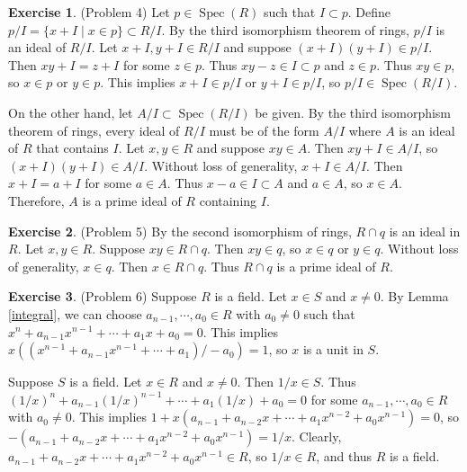 \documentclass[12pt, psamsfonts]{amsart}
\theoremstyle{definition}
\newtheorem*{exer}{Exercise}
\theoremstyle{remark}
\DeclareMathOperator{\Spec}{Spec}
\numberwithin{equation}{section}
\begin{document}
\begin{exer}{(Problem 4)}
  Let $p \in \Spec(R)$ such that $I \subset p$.
  Define $p / I = \{ x + I \mid x \in p \} \subset R / I$.
  By the third isomorphism theorem of rings, $p / I$ is an ideal of $R / I$.
  Let $x + I, y + I \in R / I$ and suppose $(x + I)(y + I) \in p / I$.
  Then $xy + I = z + I$ for some $z \in p$.
  Thus $xy - z \in I \subset p$ and $z \in p$.
  Thus $xy \in p$, so $x \in p$ or $y \in p$.
  This implies $x + I \in p / I$ or $y + I \in p / I$, so $p / I \in \Spec(R / I)$.

  On the other hand, let $A / I \subset \Spec(R / I)$ be given.
  By the third isomorphism theorem of rings, every ideal of $R / I$ must be of the form $A / I$ where $A$ is an ideal of $R$ that contains $I$.
  Let $x, y \in R$ and suppose $xy \in A$.
  Then $xy + I \in A / I$, so $(x + I)(y + I) \in A / I$.
  Without loss of generality, $x + I \in A / I$.
  Then $x + I = a + I$ for some $a \in A$.
  Thus $x - a \in I \subset A$ and $a \in A$, so $x \in A$.
  Therefore, $A$ is a prime ideal of $R$ containing $I$.
\end{exer}

\begin{exer}{(Problem 5)}
  By the second isomorphism of rings, $R \cap q$ is an ideal in $R$.
  Let $x, y \in R$.
  Suppose $xy \in R \cap q$.
  Then $xy \in q$, so $x \in q$ or $y \in q$.
  Without loss of generality, $x \in q$.
  Then $x \in R \cap q$.
  Thus $R \cap q$ is a prime ideal of $R$.
\end{exer}

\begin{exer}{(Problem 6)}
  Suppose $R$ is a field.
  Let $x \in S$ and $x \ne 0$.
  By Lemma \ref{integral}, we can choose $a_{n - 1}, \cdots, a_0 \in R$ with $a_0 \ne 0$ such that $x^n + a_{n - 1}x^{n - 1} + \cdots + a_1x + a_0 = 0$.
  This implies $x((x^{n - 1} + a_{n - 1}x^{n - 1} + \cdots + a_1) / -a_0) = 1$, so $x$ is a unit in $S$.

  Suppose $S$ is a field.
  Let $x \in R$ and $x \ne 0$.
  Then $1 / x \in S$.
  Thus $(1/x)^n + a_{n - 1}(1/x)^{n - 1} + \cdots + a_1(1/x) + a_0 = 0$ for some $a_{n - 1}, \cdots, a_0 \in R$ with $a_0 \ne 0$.
  This implies $1 + x(a_{n - 1} + a_{n - 2}x + \cdots + a_1x^{n - 2} + a_0x^{n - 1}) = 0$, so $-(a_{n - 1} + a_{n - 2}x + \cdots + a_1x^{n - 2} + a_0x^{n - 1}) = 1 / x$.
  Clearly, $a_{n - 1} + a_{n - 2}x + \cdots + a_1x^{n - 2} + a_0x^{n - 1} \in R$, so $1 / x \in R$, and thus $R$ is a field.
\end{exer}
\end{document}
